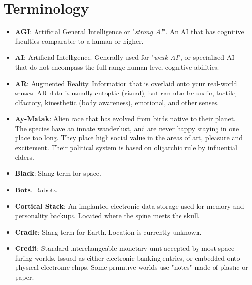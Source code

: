 \documentclass[10pt,twoside]{article}
\begin{document}
    \newpage


    \section{Terminology}

    \begin{multicols}{2}

        \begin{itemize}

            \item \textbf{AGI}: Artificial General Intelligence or "\textit{strong AI}". An AI that has cognitive faculties comparable to a human or higher.

            \item \textbf{AI}: Artificial Intelligence. Generally used for "\textit{weak AI}", or specialised AI that do not encompass the full range human-level cognitive abilities.

            \item \textbf{AR}: Augmented Reality. Information that is overlaid onto your real-world senses. AR data is usually entoptic (visual), but can also be audio, tactile, olfactory, kinesthetic (body awareness), emotional, and other senses.

            \item \textbf{Ay-Matak}: Alien race that has evolved from birds native to their planet. The species have an innate wanderlust, and are never happy staying in one place too long. They place high social value in the areas of art, pleasure and excitement. Their political system is based on oligarchic rule by influential elders.

            \item \textbf{Black}: Slang term for space.

            \item \textbf{Bots}: Robots.

            \item \textbf{Cortical Stack}: An implanted electronic data storage used for memory and personality backups. Located where the spine meets the skull.

            \item \textbf{Cradle}: Slang term for Earth. Location is currently unknown.

            \item \textbf{Credit}: Standard interchangeable monetary unit accepted by most space-faring worlds. Issued as either electronic banking entries, or embedded onto physical electronic chips. Some primitive worlds use "notes" made of plastic or paper.


\end{itemize}
\end{multicols}
\end{document}
